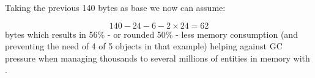Taking the previous 140 bytes as base we now can assume:

\[140-24-6-2\times24=62\] bytes which results in 56\% - or rounded 50\% - less memory consumption (and preventing the need of 4 of 5 objects in that example) helping against GC pressure when managing thousands to several millions of entities in memory with \AMBETH.